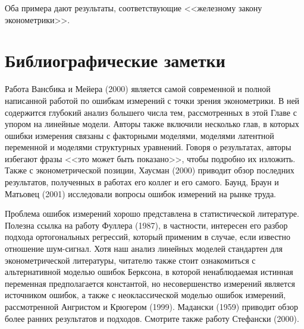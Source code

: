 Оба примера дают результаты, соответствующие <<железному закону эконометрики>>.

\section{Библиографические заметки} 

Работа Вансбика и Мейера (2000) является самой современной и полной написанной работой по ошибкам измерений с точки зрения эконометрики. В ней содержится глубокий анализ большего числа тем, рассмотренных в этой Главе с упором на линейные модели. Авторы также включили несколько глав, в которых ошибки измерения связаны с факторными моделями, моделями латентной переменной и моделями структурных уравнений. Говоря о результатах, авторы избегают фразы <<это может быть показано>>, чтобы подробно их изложить. Также с эконометрической позиции, Хаусман (2000) приводит обзор последних результатов, полученных в работах его коллег и его самого. Баунд, Браун и Матьовец (2001) исследовали вопросы ошибок измерений на рынке труда.

Проблема ошибок измерений хорошо представлена в статистической литературе. Полезна ссылка на работу Фуллера (1987), в частности, интересен его разбор подхода ортогональных регрессий, который применим в случае, если известно отношение шум-сигнал. Хотя наш анализ линейных моделей стандартен для эконометрической литературы, читателю также стоит ознакомиться с альтернативной моделью ошибок Берксона, в которой ненаблюдаемая истинная переменная предполагается константой, но несовершенство измерений является источником ошибок, а также с неоклассической моделью ошибок измерений, рассмотренной Ангристом и Крюгером (1999). Мадански (1959) приводит обзор более ранних результатов и подходов. Смотрите также работу Стефански (2000).

